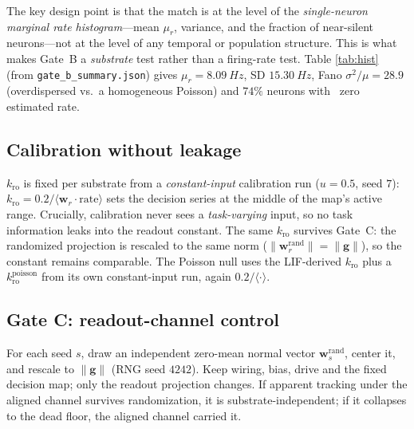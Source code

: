 \documentclass[10pt,a4paper]{article}
\begin{document}
The key design point is that the match is at the level of the
\emph{single-neuron marginal rate histogram}---mean $\mu_r$, variance,
and the fraction of near-silent neurons---not at the level of any
temporal or population structure. This is what makes Gate~B a
\emph{substrate} test rather than a firing-rate test. Table
\ref{tab:hist} (from \texttt{gate\_b\_summary.json}) gives
$\mu_r=\SI{8.09}{Hz}$, SD $\SI{15.30}{Hz}$, Fano
$\sigma^2/\mu=28.9$ (overdispersed vs.\ a homogeneous Poisson) and
$74\%$ neurons with ~zero estimated rate.

\begin{table}[H]
\centering
\caption{Match quality of the dead null to the LIF marginal:
per-neuron mean rate, SD, Fano factor $\sigma^2/\mu$, and the silent
fraction (neuron with $\hat r_i\approx0$). The null draws Bernoulli
events at the matched per-neuron probabilities, independent of $u$.}
\label{tab:hist}

\end{table}

\subsection{Calibration without leakage}\label{sec:calib}

$k_{\mathrm{ro}}$ is fixed per substrate from a \emph{constant-input}
calibration run ($u=0.5$, seed $7$): $k_{\mathrm{ro}}=0.2/
\langle \mathbf{w}_r\!\cdot \mathrm{rate}\rangle$ sets the decision
series at the middle of the map's active range. Crucially, calibration
never sees a \emph{task-varying} input, so no task information leaks
into the readout constant. The same $k_{\mathrm{ro}}$ survives Gate~C:
the randomized projection is rescaled to the same norm
($\|\mathbf{w}_r^{\mathrm{rand}}\|=\|\mathbf{g}\|$), so the constant
remains comparable. The Poisson null uses the LIF-derived $k_{\mathrm{ro}}$
plus a $k_{\mathrm{ro}}^{\mathrm{poisson}}$ from its own constant-input
run, again $0.2/\langle\cdot\rangle$.

\subsection{Gate C: readout-channel control}\label{sec:gatec}

For each seed $s$, draw an independent zero-mean normal vector
$\mathbf{w}^{\mathrm{rand}}_s$, center it, and rescale to
$\|\mathbf{g}\|$ (RNG seed $4242$). Keep wiring, bias, drive and the
fixed decision map; only the readout projection changes. If apparent
tracking under the aligned channel survives randomization, it is
substrate-independent; if it collapses to the dead floor, the aligned
channel carried it.
\end{document}
